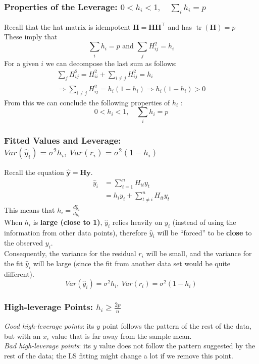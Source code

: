 \documentclass[11pt,a4paper]{article}
\begin{document}
\subsubsection{Properties of the Leverage: $0<h_{i}<1, \quad \sum_{i} h_{i}=p$}
Recall that the hat matrix is idempotent $\mathbf{H}=\mathbf{H H}^{\top}$ and has $\operatorname{tr}(\mathbf{H})=p$\\
These imply that
$$
\sum_{i} h_{i}=p \text { and } \sum_{j} H_{i j}^{2}=h_{i}
$$
For a given $i$ we can decompose the last sum as follows:
$$
\begin{gathered}
\sum_{j} H_{i j}^{2}=H_{i i}^{2}+\sum_{i \neq j} H_{i j}^{2}=h_{i} \\
\Rightarrow \sum_{i \neq j} H_{i j}^{2}=h_{i}\left(1-h_{i}\right) \Rightarrow h_{i}\left(1-h_{i}\right)>0
\end{gathered}
$$
From this we can conclude the following properties of $h_{i}$ :
$$
0<h_{i}<1, \quad \sum_{i} h_{i}=p
$$

\subsubsection{Fitted Values and Leverage: $Var(\hat{y}_i)=\sigma^2 h_i,\ Var(r_i)=\sigma^2(1-h_i)$}
Recall the equation $\hat{\mathbf{y}}=\mathbf{H}\mathbf{y}$.\\
\begin{equation}
    \begin{aligned}
        \hat{y}_i&=\sum_{t=1}^nH_{it}y_t\\
        &=h_iy_i+\sum_{t\neq i}^nH_{it}y_t
    \end{aligned}
    \nonumber
\end{equation}
This means that $h_i=\frac{d \hat{y}_i}{d y_i}$\\
When $h_i$ is \textbf{large (close to 1)}, $\hat{y}_i$ relies heavily on $y_i$ (instead of using the information from other data points), therefore $\hat{y}_i$ will be “forced” to be \textbf{close} to the observed $y_i$.\\
Consequently, the variance for the residual $r_i$ will be small, and the variance for the ﬁt $\hat{y}_i$ will be large (since the ﬁt from another data set would be quite different).
$$Var(\hat{y}_i)=\sigma^2 h_i,\ Var(r_i)=\sigma^2(1-h_i)$$

\subsubsection{High-leverage Points: $h_i\geq \frac{2p}{n}$}
\textit{Good high-leverage points}: its $y$ point follows the pattern of the rest of the data, but with an $x_i$ value that is far away from the sample mean.\\
\textit{Bad high-leverage points}: its $y$ value does not follow the pattern suggested by the rest of the data; the LS ﬁtting might change a lot if we remove this point.\\
\end{document}
